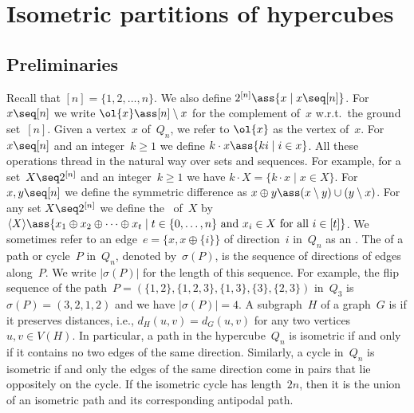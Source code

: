 \section{Isometric partitions of hypercubes}
%
\subsection{Preliminaries}
%
Recall that $[n]=\{1,2,\ldots,n\}$.
We also define $2^{[n]}\ass\{x\mid x\seq [n]\}$.
For $x\seq [n]$ we write $\ol{x}\ass[n]\setminus x$ for the complement of~$x$ w.r.t.\ the ground set~$[n]$.
Given a vertex~$x$ of~$Q_n$, we refer to $\ol{x}$ as the  vertex of~$x$.
For $x\seq [n]$ and an integer~$k\geq 1$ we define $k\cdot x\ass\{ki\mid i\in x\}$.
All these operations thread in the natural way over sets and sequences.
For example, for a set~$X\seq 2^{[n]}$ and an integer~$k\geq 1$ we have $k\cdot X=\{k\cdot x\mid x\in X\}$.
%
For $x,y\seq [n]$ we define the symmetric difference as $x\oplus y\ass(x\setminus y)\cup (y\setminus x)$.
For any set $X\seq 2^{[n]}$ we define the ~of~$X$ by $\langle X\rangle\ass\{x_1\oplus x_2\oplus \cdots\oplus x_t\mid t\in\{0,\ldots,n\}\text{ and } x_i\in X\text{ for all }i\in[t]\}$.
%
We sometimes refer to an edge~$e=\{x,x\oplus\{i\}\}$ of direction~$i$ in~$Q_n$ as an .
The  of a path or cycle~$P$ in~$Q_n$, denoted by~$\sigma(P)$, is the sequence of directions of edges along~$P$.
We write $|\sigma(P)|$ for the length of this sequence.
For example, the flip sequence of the path~$P=(\{1,2\},\{1,2,3\},\{1,3\},\{3\},\{2,3\})$ in~$Q_3$ is $\sigma(P)=(3,2,1,2)$ and we have $|\sigma(P)|=4$.
%
A subgraph~$H$ of a graph~$G$ is  if it preserves distances, i.e., $d_H(u,v)=d_G(u,v)$ for any two vertices $u,v \in V(H)$.
In particular, a path in the hypercube~$Q_n$ is isometric if and only if it contains no two edges of the same direction.
Similarly, a cycle in~$Q_n$ is isometric if and only the edges of the same direction come in pairs that lie oppositely on the cycle.
If the isometric cycle has length~$2n$, then it is the union of an isometric path and its corresponding antipodal path.
%
